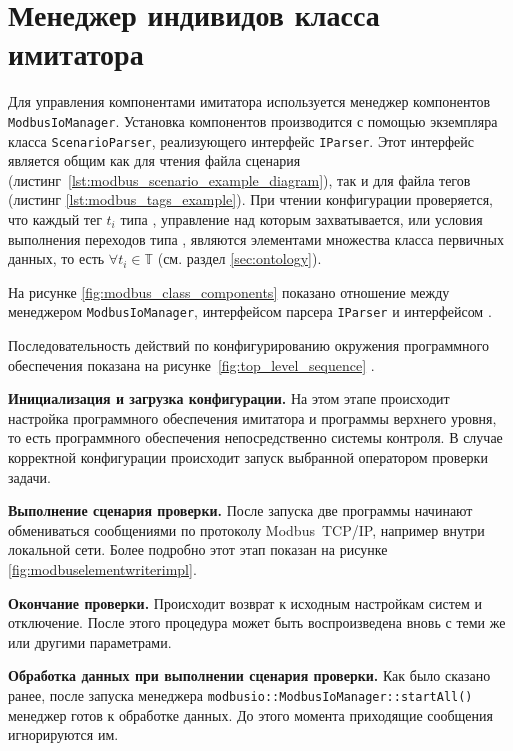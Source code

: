 \section{Менеджер индивидов класса \mbwriter имитатора}
Для управления компонентами имитатора используется менеджер компонентов \texttt{ModbusIoManager}.
Установка компонентов производится с помощью экземпляра класса \texttt{ScenarioParser}, реализующего интерфейс \texttt{IParser}.
Этот интерфейс является общим как для чтения файла сценария (листинг~\ref{lst:modbus_scenario_example_diagram}),
так и для файла тегов (листинг \ref{lst:modbus_tags_example}).
При чтении конфигурации проверяется, что каждый тег $t_i$ типа \mbdata,
управление над которым захватывается, или условия выполнения переходов типа \mbrelationed,
являются элементами множества класса первичных данных, то есть $\forall t_i \in \mathbb{T}$ (см. раздел \ref{sec:ontology}).

На рисунке \ref{fig:modbus_class_components} показано отношение между менеджером \texttt{ModbusIoManager},
интерфейсом парсера \texttt{IParser} и интерфейсом \mbwriter.



Последовательность действий по конфигурированию окружения программного обеспечения
показана на рисунке~\ref{fig:top_level_sequence} \cite[стр. 239]{book:oop:oop_analize}.


\textbf{Инициализация и загрузка конфигурации.}
На этом этапе происходит настройка программного обеспечения
имитатора и программы верхнего уровня,
то есть программного обеспечения непосредственно системы контроля.
В случае корректной конфигурации происходит запуск
выбранной оператором проверки задачи.

\textbf{Выполнение сценария проверки.}
После запуска две программы начинают обмениваться 
сообщениями по протоколу Modbus~TCP/IP, например внутри локальной сети.
Более подробно этот этап показан на рисунке \ref{fig:modbuselementwriterimpl}.

\textbf{Окончание проверки.}
Происходит возврат к исходным настройкам систем и отключение.
После этого процедура может быть воспроизведена вновь с теми же
или другими параметрами. 


\textbf{Обработка данных при выполнении сценария проверки.}
Как было сказано ранее, после запуска менеджера \texttt{modbusio::\-ModbusIoManager::\-start\-All()}
менеджер готов к обработке данных.
До этого момента приходящие сообщения игнорируются им.

